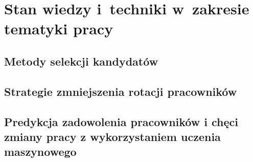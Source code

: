 \chapter{Stan wiedzy i~techniki w~zakresie tematyki pracy}\label{ch:knowladge-state}
\section{Metody selekcji kandydatów}\label{sec:employee-selection}
\todo{}

\section{Strategie zmniejszenia rotacji pracowników}\label{sec:employee-turnover}
\todo{}

\section{Predykcja zadowolenia pracowników i chęci zmiany pracy z wykorzystaniem uczenia maszynowego}\label{sec:employee-turnover-machine-learning}

\thispagestyle{normal}
